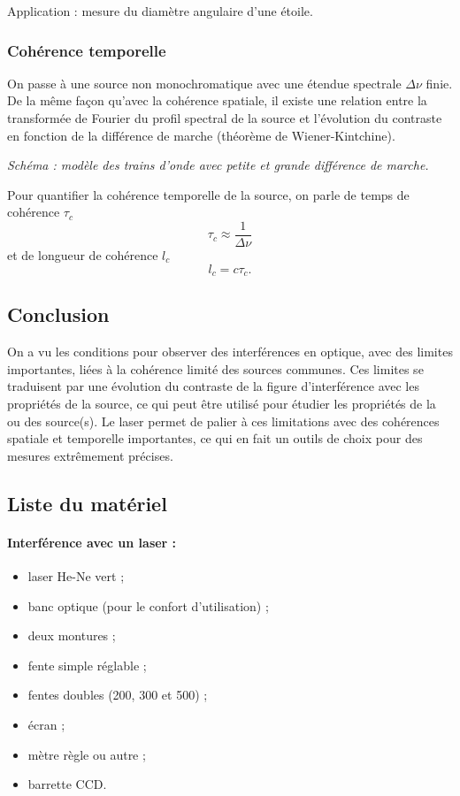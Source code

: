 Application : mesure du diamètre angulaire d'une étoile.

\subsubsection{Cohérence temporelle}

On passe à une source non monochromatique avec une étendue spectrale $\Delta\nu$ finie.
De la même façon qu'avec la cohérence spatiale, il existe une relation entre la transformée de Fourier du profil spectral de la source et l'évolution du contraste en fonction de la différence de marche (théorème de Wiener-Kintchine).

\emph{Schéma : modèle des trains d'onde avec petite et grande différence de marche.}

Pour quantifier la cohérence temporelle de la source, on parle de temps de cohérence $\tau_c$
\begin{equation}
\tau_c \approx \frac{1}{\Delta\nu}
\end{equation}
et de longueur de cohérence $l_c$
\begin{equation}
l_c = c\tau_c.
\end{equation}

\subsection{Conclusion}

On a vu les conditions pour observer des interférences en optique, avec des limites importantes, liées à la cohérence limité des sources communes.
Ces limites se traduisent par une évolution du contraste de la figure d'interférence avec les propriétés de la source, ce qui peut être utilisé pour étudier les propriétés de la ou des source(s).
Le laser permet de palier à ces limitations avec des cohérences spatiale et temporelle importantes, ce qui en fait un outils de choix pour des mesures extrêmement précises.

\subsection*{Liste du matériel}

\paragraph{Interférence avec un laser :}
\begin{itemize}
\item laser He-Ne vert ;
\item banc optique (pour le confort d'utilisation) ;
\item deux montures ;
\item fente simple réglable ;
\item fentes doubles (200, 300 et \unit{500}{\micro\meter}) ;
\item écran ;
\item mètre règle ou autre ;
\item barrette CCD.
\end{itemize}

